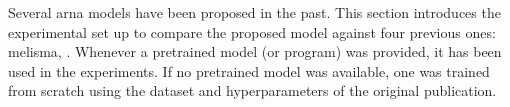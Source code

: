 
Several \gls{arna} models have been proposed in the past.
This section introduces the experimental set up to compare
the proposed model against four previous ones:
\gls{melisma}, \textcite{chen2021attend, micchi2021deep,
mcleod2021modular}. Whenever a pretrained model (or program)
was provided, it has been used in the experiments. If no
pretrained model was available, one was trained from scratch
using the dataset and hyperparameters of the original
publication. 
